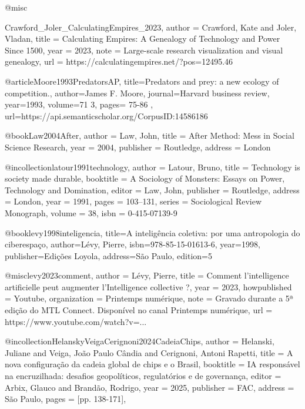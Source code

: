 @misc{Crawford_Joler_CalculatingEmpires_2023,
  author = {Crawford, Kate and Joler, Vladan},
  title  = {Calculating Empires: A Genealogy of Technology and Power Since 1500},
  year   = {2023},
  note   = {Large-scale research visualization and visual genealogy},
  url    = {https://calculatingempires.net/?pos=12495.46%
}

@article{Moore1993PredatorsAP,
  title={Predators and prey: a new ecology of competition.},
  author={James F. Moore},
  journal={Harvard business review},
  year={1993},
  volume={71 3},
  pages={
          75-86
        },
  url={https://api.semanticscholar.org/CorpusID:14586186}
}

@book{Law2004After,
  author    = {Law, John},
  title     = {After Method: Mess in Social Science Research},
  year      = {2004},
  publisher = {Routledge},
  address   = {London}
}

@incollection{latour1991technology,
  author    = {Latour, Bruno},
  title     = {Technology is society made durable},
  booktitle = {A Sociology of Monsters: Essays on Power, Technology and Domination},
  editor    = {Law, John},
  publisher = {Routledge},
  address   = {London},
  year      = {1991},
  pages     = {103--131},
  series    = {Sociological Review Monograph},
  volume    = {38},
  isbn      = {0-415-07139-9}
}

@book{levy1998inteligencia,
  title={A inteligência coletiva: por uma antropologia do ciberespaço},
  author={Lévy, Pierre},
  isbn={978-85-15-01613-6},
  year={1998},
  publisher={Edições Loyola},
  address={São Paulo},
  edition={5}
}

@misc{levy2023comment,
  author       = {Lévy, Pierre},
  title        = {Comment l'intelligence artificielle peut augmenter l'Intelligence collective ?},
  year         = {2023},
  howpublished = {Youtube},
  organization = {Printemps numérique},
  note         = {Gravado durante a 5ª edição do MTL Connect. Disponível no canal Printemps numérique},
  url          = {https://www.youtube.com/watch?v=...}
}

@incollection{HelanskyVeigaCerignoni2024CadeiaChips,
  author = {Helanski, Juliane and Veiga, João Paulo Cândia and Cerignoni, Antoni Rapetti},
  title = {A nova configuração da cadeia global de chips e o Brasil},
  booktitle = {IA responsável na encruzilhada: desafios geopolíticos, regulatórios e de governança},
  editor = {Arbix, Glauco and Brandão, Rodrigo},
  year = {2025},
  publisher = {FAC},
  address = {São Paulo},
  pages = {[pp. 138-171]},
}

}
